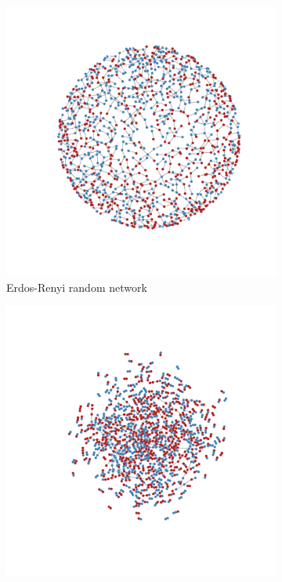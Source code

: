 \documentclass[man, 12pt, a4paper, noextraspace]{apa6}
\begin{document}
\begin{figure}
\captionsetup[subfigure]{labelfont=bf,textfont=normalfont,singlelinecheck=on}
    \centering
    \begin{subfigure}[t]{0.45\textwidth}
        \centering
        \includegraphics[trim={2cm 2cm 2cm 2cm}, clip, width=\linewidth]{draft/network_plots1.pdf} 
        \caption{Erdos-Renyi random network}
        \label{fig1:random}
    \end{subfigure}
    \hfill
    \begin{subfigure}[t]{0.45\textwidth}
        \centering
        \includegraphics[trim={2cm 2cm 2cm 2cm}, clip, width=\linewidth]{draft/network_plots2.pdf} 

\end{subfigure}
\end{figure}
\end{document}
